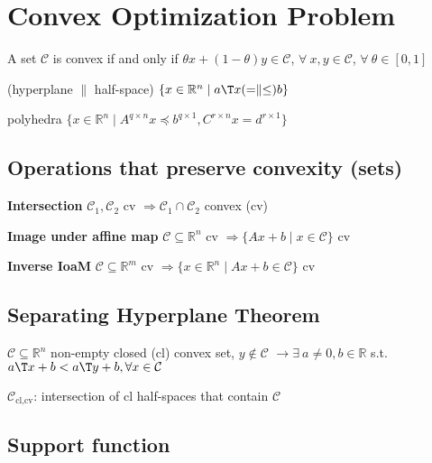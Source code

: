 \section{Convex Optimization Problem}

\begin{definition}
	A set $\mathcal{C}$ is convex if and only if
	$\theta x + (1-\theta)y \in \mathcal{C}$,
	$\forall\ x,y \in \mathcal{C}$,
	$\forall\ \theta \in [0,1]$
\end{definition}

(hyperplane $\parallel$ half-space)
$\{x \in \mathbb{R}^n \mid a\T x(=\parallel\le)b\}$

polyhedra $\{x\in\mathbb{R}^n\mid A^{q\times n}x\preceq b^{q\times1},C^{r\times n}x=d^{r\times1}\}$


\subsection{Operations that preserve convexity (sets)}

\textbf{Intersection}
$\mathcal{C}_1, \mathcal{C}_2$ cv $\Rightarrow \mathcal{C}_1 \cap \mathcal{C}_2$ convex (cv)

\textbf{Image under affine map}
$\mathcal{C} \subseteq  \mathbb{R}^{n}$ cv
$\Rightarrow \{Ax+b \mid x \in \mathcal{C} \}$ cv

\textbf{Inverse IoaM}
$\mathcal{C} \subseteq  \mathbb{R}^{m}$ cv
$\Rightarrow \{x\in\mathbb{R}^{n} \mid  Ax+b\in\mathcal{C}\}$ cv

\subsection{Separating Hyperplane Theorem}

\begin{theorem}
	$\mathcal{C} \subseteq \mathbb{R}^{n}$ non-empty closed (cl) convex set, $y \notin \mathcal{C}$
	$\rightarrow \exists\ a \ne 0, b \in \mathbb{R}$
	s.t. $a\T x + b < a\T y + b,
		\forall x \in \mathcal{C}$
\end{theorem}

\begin{corollary}
	$\mathcal{C}_\text{cl,cv}$: intersection of cl half-spaces that contain $\mathcal{C}$
\end{corollary}

\subsection{Support function}

